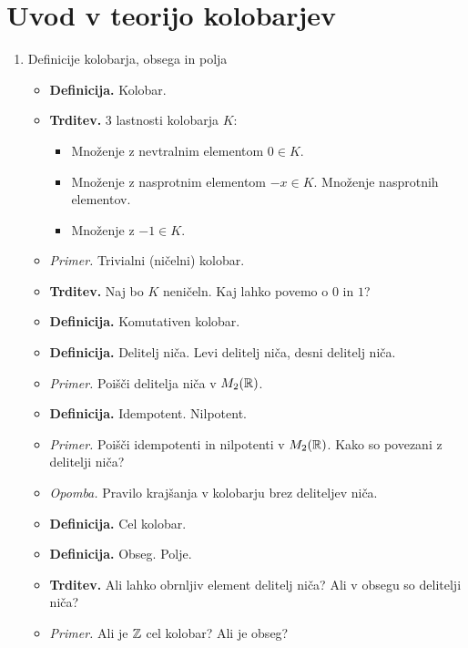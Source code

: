 \section{Uvod v teorijo kolobarjev}
\begin{enumerate}
    \item Definicije kolobarja, obsega in polja
    \begin{itemize}
        \item \colorbox{purple!30}{\textbf{Definicija.}} Kolobar.
        \item \colorbox{blue!30}{\textbf{Trditev.}} 3 lastnosti kolobarja $K$:
        \begin{itemize}
            \item Množenje z nevtralnim elementom $0 \in K$.
            \item Množenje z nasprotnim elementom $-x \in K$. Množenje nasprotnih elementov.
            \item Množenje z $-1 \in K$.
        \end{itemize}
        \item \colorbox{yellow!30}{\emph{Primer.}} Trivialni (ničelni) kolobar.
        \item \colorbox{blue!30}{\textbf{Trditev.}} Naj bo $K$ neničeln. Kaj lahko povemo o $0$ in $1$?
        \item \colorbox{purple!30}{\textbf{Definicija.}} Komutativen kolobar.
        \item \colorbox{purple!30}{\textbf{Definicija.}} Delitelj niča. Levi delitelj niča, desni delitelj niča.
        \item \colorbox{yellow!30}{\emph{Primer.}} Poišči delitelja niča v $M_2(\mathbb{R})$.
        \item \colorbox{purple!30}{\textbf{Definicija.}} Idempotent. Nilpotent.
        \item \colorbox{yellow!30}{\emph{Primer.}} Poišči idempotenti in nilpotenti v $M_2(\mathbb{R})$. Kako so povezani z delitelji niča?
        \item \colorbox{yellow!30}{\emph{Opomba.}} Pravilo krajšanja v kolobarju brez deliteljev niča.
        \item \colorbox{purple!30}{\textbf{Definicija.}} Cel kolobar.
        \item \colorbox{purple!30}{\textbf{Definicija.}} Obseg. Polje.
        \item \colorbox{blue!30}{\textbf{Trditev.}} Ali lahko obrnljiv element delitelj niča? Ali v obsegu so delitelji niča?
        \item \colorbox{yellow!30}{\emph{Primer.}} Ali je $\mathbb{Z}$ cel kolobar? Ali je obseg?
    \end{itemize}   
    

\end{enumerate}
